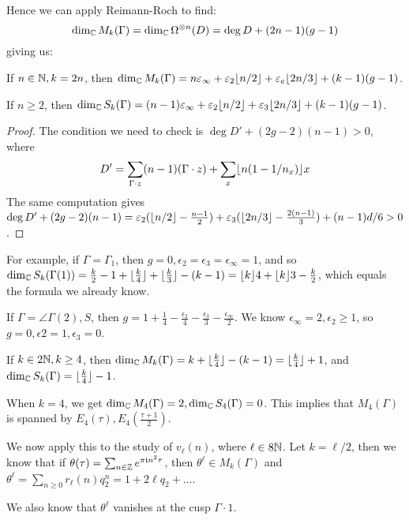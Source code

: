 \documentclass[10pt,a4paper]{article}
\begin{document}
Hence we can apply Reimann-Roch to find:
\[\dim_{\mathbb{C}} M_k(\Gamma) = \dim_{\mathbb{C}} \Omega^{\otimes n}(D) = \deg D + (2n-1)(g-1)\]
giving us:
\begin{theorem}
  If $n \in \mathbb{N}, k= 2n$, then $\dim_{\mathbb{C}} M_k(\Gamma) = n\varepsilon_\infty + \varepsilon_2\lfloor n/2 \rfloor + \varepsilon_e \lfloor 2n/3 \rfloor + (k-1)(g-1)$.

  If $n \geq 2$, then $\dim_{\mathbb{C}} S_k(\Gamma) = (n-1)\varepsilon_\infty + \varepsilon_2\lfloor n/2 \rfloor + \varepsilon_3 \lfloor 2n/3 \rfloor + (k-1)(g-1)$.
\end{theorem}
\begin{proof}
  The condition we need to check is $\deg D' + (2g-2)(n-1) > 0$, where
  \[D' = \sum_{\Gamma \cdot z}(n-1)(\Gamma\cdot z)  + \sum_{x} \lfloor n(1-1/n_x) \rfloor x\]
  The same computation gives $\deg D' + (2g-2)(n-1) = \varepsilon_2(\lfloor n/2 \rfloor - \frac{n-1}{2}) + \varepsilon_3(\lfloor 2n/3 \rfloor - \frac{2(n-1)}{3}) + (n-1)d/6 > 0$.
\end{proof}
For example, if $\Gamma = \Gamma_1$, then $g=0, \epsilon_2=  \epsilon_3 = \epsilon_\infty = 1$, and so $\dim_{\mathbb{C}} S_k(\Gamma(1)) = \frac{k}{2}-1 + \lfloor \frac{k}{4} \rfloor + \lfloor \frac{k}{3} \rfloor - (k-1) = \lfloor k \rfloor{4} + \lfloor k \rfloor{3} - \frac{k}{2}$, which equals the formula we already know.

If $\Gamma = \angle{\Gamma(2), S}$, then $g = 1 + \frac{1}{4} - \frac{\epsilon_2}{4} - \frac{\epsilon_3}{3} - \frac{\epsilon_\infty}{2}$. We know $\epsilon_\infty = 2, \epsilon_2 \geq 1$, so $g = 0, \epsilon2 = 1, \epsilon_3 = 0$.

If $k \in 2\mathbb{N}, k \geq 4$, then $\dim_{\mathbb{C}} M_k(\Gamma) = k+\lfloor \frac{k}{4} \rfloor - (k-1) = \lfloor \frac{k}{4} \rfloor+1$, and $\dim_{\mathbb{C}} S_k(\Gamma) = \lfloor \frac{k}{4} \rfloor - 1$.

When $k=4$, we get $\dim_{\mathbb{C}} M_4(\Gamma) = 2, \dim_{\mathbb{C}} S_4(\Gamma) = 0$. This implies that $M_4(\Gamma)$ is spanned by $E_4(\tau), E_4(\frac{\tau+1}{2})$.

We now apply this to the study of $v_\ell(n)$, where $\ell \in 8 \mathbb{N}$. Let $k = \ell/2$, then we know that if $\theta(\tau) = \sum_{n \in \mathbb{Z}}e^{\pi\mathfrak{i} n^2 \tau}$, then $\theta^\ell \in M_k(\Gamma)$ and $\theta^\ell = \sum_{n \geq 0}r_\ell(n) q_2^n = 1 + 2\ell q_2 + \ldots$.

We also know that $\theta^\ell$ vanishes at the cusp $\Gamma \cdot 1$.
\end{document}
